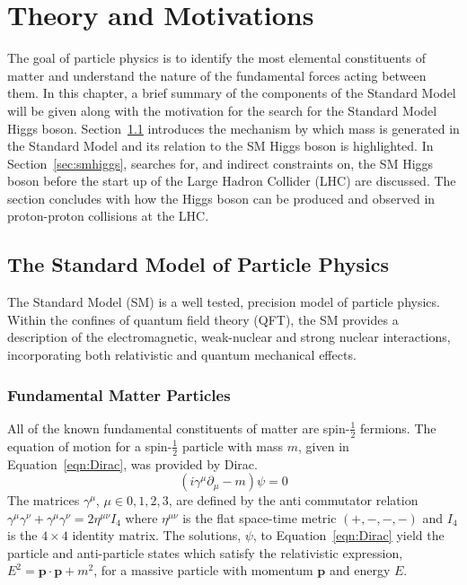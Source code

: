 \chapter{Theory and Motivations}
\label{chap:theory}

The goal of particle physics is to identify 
the most elemental constituents of matter and understand the nature of
the fundamental forces acting between them. In this chapter, a brief summary of 
the components of the Standard Model  will be given along with the motivation for
the search for the Standard Model Higgs boson. 
Section~\ref{sec:sm} introduces the mechanism by which mass is generated in the 
Standard Model and its relation to the SM Higgs boson is highlighted.
In Section~\ref{sec:smhiggs}, 
searches for, and indirect constraints on, the SM Higgs boson before the start up of 
the Large Hadron Collider (LHC) are discussed. The section concludes with 
how the Higgs boson can be produced and observed in proton-proton collisions at the LHC.

\section{The Standard Model of Particle Physics}
\label{sec:sm}

The Standard Model (SM) is  
a well tested, precision model of particle physics. 
Within the confines of quantum field theory (QFT),  
the SM provides a description of the electromagnetic, weak-nuclear
and strong nuclear interactions, incorporating
both relativistic and quantum mechanical effects.

\subsection{Fundamental Matter Particles}
All of the known fundamental constituents of matter
are spin-$\frac{1}{2}$ fermions. 
The equation of motion for a spin-$\frac{1}{2}$ particle with mass $m$, 
given in Equation~\ref{eqn:Dirac}, was provided by Dirac.
\begin{equation}
(i\gamma^{\mu}\partial_{\mu} - m)\psi = 0
\label{eqn:Dirac}
\end{equation}
The matrices $\gamma^{\mu}$, $\mu\in{0,1,2,3}$,  are
defined by the anti commutator relation 
$\gamma^{\mu}\gamma^{\nu}+\gamma^{\mu}\gamma^{\nu} = 2\eta^{\mu\nu}I_{4}$ where
$\eta^{\mu\nu}$ is the flat space-time metric $(+,-,-,-)$ and $I_{4}$ is the $4\times4$
identity matrix.
The solutions, $\psi$, to Equation~\ref{eqn:Dirac} yield the particle and anti-particle
states which satisfy the relativistic expression, 
$E^{2} = \mathbf{p}\cdot\mathbf{p} + m^{2}$, for a 
massive particle with momentum $\mathbf{p}$ and energy $E$.
 
